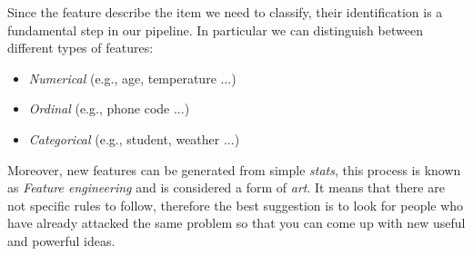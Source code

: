 Since the feature describe the item we need to classify, their identification is a fundamental step in our pipeline. In particular we can distinguish between different types of features:
\begin{itemize}
\item \emph{Numerical} (e.g., age, temperature ...)
\item \emph{Ordinal} (e.g., phone code ...)
\item \emph{Categorical} (e.g., student, weather ...)
\end{itemize}

Moreover, new features can be generated from simple \emph{stats}, this process is known as \emph{Feature engineering} and  is considered a form of \emph{art}. It means that there are not specific rules to follow,  therefore the best suggestion is to look for people who have already attacked the same problem so that you can come up with new useful and powerful ideas.

